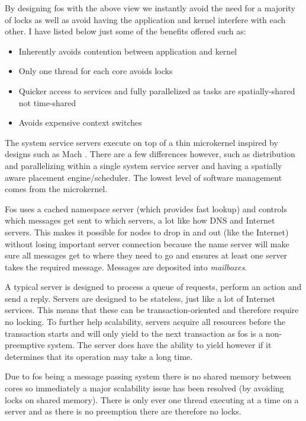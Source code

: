 \documentclass[journal]{IEEEtran}
\begin{document}
\vspace{5 mm}

By designing fos with the above view we instantly avoid the need for a majority of locks as well as avoid having the application and kernel interfere with each other. I have listed below just some of the benefits offered such as:

\vspace{2 mm}

\begin{itemize}
\item Inherently avoids contention between application and kernel
\item Only one thread for each core avoids locks
\item Quicker access to services and fully parallelized as tasks are spatially-shared not time-shared
\item Avoids expensive context switches
\end{itemize}

\vspace{5 mm}

The system service servers execute on top of a thin microkernel inspired by designs such as Mach \cite{Mach}. There are a few differences however, such as distribution and parallelizing within a single system service server and having a spatially aware placement engine/scheduler. The lowest level of software management comes from the microkernel.

Fos uses a cached namespace server (which provides fast lookup) and controls which messages get sent to which servers, a lot like how DNS and Internet servers. This makes it possible for nodes to drop in and out (like the Internet) without losing important server connection because the name server will make sure all messages get to where they need to go and ensures at least one server takes the required message. Messages are deposited into \emph{mailboxes}.

A typical server is designed to process a queue of requests, perform an action and send a reply. Servers are designed to be stateless, just like a lot of Internet services. This means that these can be transaction-oriented and therefore require no locking. To further help scalability, servers acquire all resources before the transaction starts and will only yield to the next transaction as fos is a non-preemptive system. The server does have the ability to yield however if it determines that its operation may take a long time.

Due to fos being a message passing system there is no shared memory between cores so immediately a major scalability issue has been resolved (by avoiding locks on shared memory). There is only ever one thread executing at a time on a server and as there is no preemption there are therefore no locks. 
\end{document}
